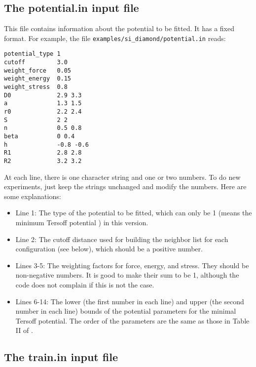 \documentclass[12pt,a4paper]{report}
\begin{document}
\subsection{The potential.in input file}

This file contains information about the potential to be fitted. It has a fixed format. For example, the file \verb"examples/si_diamond/potential.in" reads:
\begin{verbatim}
potential_type 1
cutoff         3.0
weight_force   0.05
weight_energy  0.15
weight_stress  0.8
D0             2.9 3.3
a              1.3 1.5
r0             2.2 2.4
S              2 2
n              0.5 0.8
beta           0 0.4
h              -0.8 -0.6
R1             2.8 2.8
R2             3.2 3.2
\end{verbatim}
At each line, there is one character string and one or two numbers. To do new experiments, just keep the strings unchanged and modify the numbers. Here are some explanations:
\begin{itemize}
\item Line 1: The type of the potential to be fitted, which can only be 1  (means the minimum Tersoff potential \cite{fan2019arxiv}) in this version.
\item Line 2: The cutoff distance used for building the neighbor list for each configuration (see below), which should be a positive number.
\item Lines 3-5: The weighting factors for force, energy, and stress. They should be non-negative numbers. It is good to make their sum to be 1, although the code does not complain if this is not the case.
\item Lines 6-14: The lower (the first number in each line) and upper (the second number in each line) bounds of the potential parameters for the minimal Tersoff potential. The order of the parameters are the same as those in Table II of \cite{fan2019arxiv}.
\end{itemize}


\subsection{The train.in input file}
\end{document}

